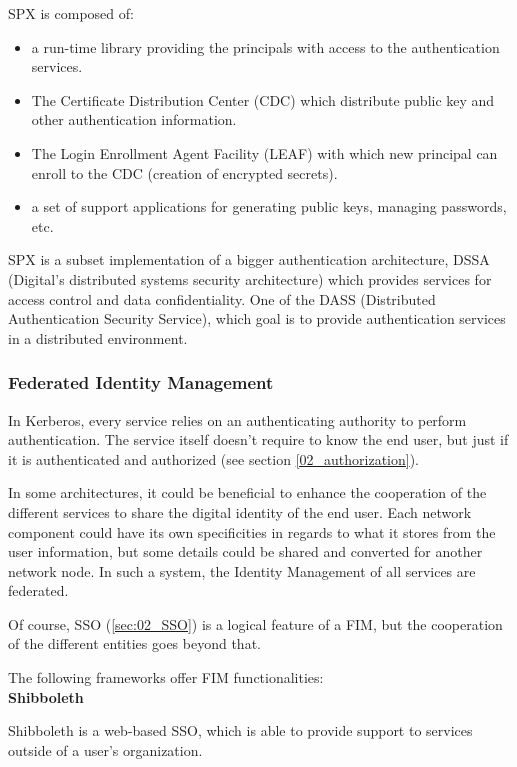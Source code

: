 SPX is composed of:
\begin{itemize}
	\item a run-time library providing the principals with access to the authentication services.
	\item The Certificate Distribution Center (CDC) which distribute public key and other authentication information.
	\item The Login Enrollment Agent Facility (LEAF) with which new principal can enroll to the CDC (creation of encrypted secrets).
	\item a set of support applications for generating public keys, managing passwords, etc.
\end{itemize}	  

SPX is a subset implementation of a bigger authentication architecture, DSSA (Digital's distributed systems security architecture)\cite{gasser1989digital} which provides services for access control and data confidentiality. One of the DASS (Distributed Authentication Security Service)\cite{kaufman1991distributed}, which goal is to provide authentication services in a distributed environment.

\subsubsection{Federated Identity Management} 
In Kerberos, every service relies on an authenticating authority to perform authentication. The service itself doesn't require to know the end user, but just if it is authenticated and authorized (see section \ref{02_authorization}).

In some architectures, it could be beneficial to enhance the cooperation of the different services to share the digital identity of the end user. Each network component could have its own specificities in regards to what it stores from the user information, but some details could be shared and converted for another network node. In such a system, the Identity Management of all services are federated.

Of course, SSO (\ref{sec:02_SSO}) is a logical feature of a FIM, but the cooperation of the different entities goes beyond that. 

The following frameworks offer FIM functionalities: 
\\

\quad \tabitem \textbf{Shibboleth} 
\label{02_shibboleth}

Shibboleth\cite{erdos2002shibboleth} is a web-based SSO, which is able to provide support to services outside of a user's organization.
 
